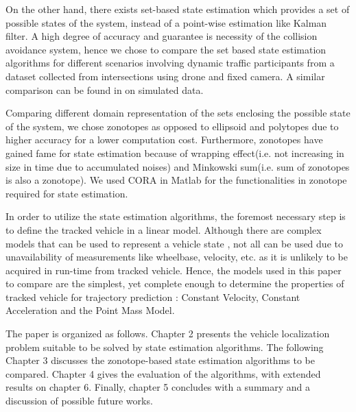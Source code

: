 On the other hand, there exists set-based state estimation which provides a set of possible states of the system, instead of a point-wise estimation like Kalman filter. A high degree of accuracy and guarantee is necessity of the collision avoidance system, hence we chose to compare the set based state estimation algorithms for different scenarios involving dynamic traffic participants from a dataset collected from intersections using drone and fixed camera. A similar comparison can be found in \cite{Rath} on simulated data.

Comparing different domain representation of the sets enclosing the possible state of the system, we chose zonotopes as opposed to ellipsoid and polytopes due to higher accuracy for a lower computation cost. Furthermore, zonotopes have gained fame for state estimation because of wrapping effect(i.e. not increasing in size in time due to accumulated noises) and Minkowski sum(i.e. sum of zonotopes is also a zonotope). We used CORA in Matlab for the functionalities in zonotope required for state estimation.

In order to utilize the state estimation algorithms, the foremost necessary step is to define the tracked vehicle in a linear model. Although there are complex models that can be used to represent a vehicle state \cite{Althoff}, not all can be used due to unavailability of measurements like wheelbase, velocity, etc. as it is unlikely to be acquired in run-time from tracked vehicle. Hence, the models used in this paper to compare are the simplest, yet complete enough to determine the properties of tracked vehicle for trajectory prediction : Constant Velocity, Constant Acceleration and the Point Mass Model.

The paper is organized as follows. Chapter 2 presents the vehicle localization problem suitable to be solved by state estimation algorithms. The following Chapter 3 discusses the zonotope-based state estimation algorithms to be compared. Chapter 4 gives the evaluation of the algorithms, with extended results on chapter 6. Finally, chapter 5 concludes with a summary and a discussion of possible future works.




